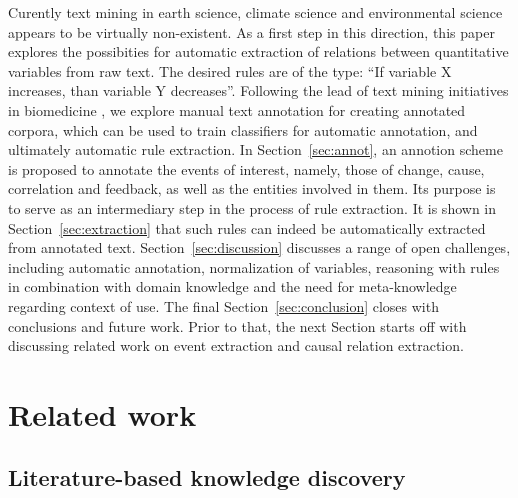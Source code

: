 \documentclass[10pt, a4paper]{article}
\begin{document}
Curently text mining in earth science, climate science and environmental science appears to be virtually non-existent. 
As a first step in this direction, this paper explores the possibities for automatic extraction of relations between quantitative variables from raw text.
The desired rules are of the type: ``If variable X increases, than variable Y decreases''.
Following the lead of text mining initiatives in biomedicine \cite{Kim2009Overview}, we explore manual text annotation for creating annotated corpora, which can be used to train classifiers for automatic annotation, and ultimately automatic rule extraction. 
In Section~\ref{sec:annot}, an annotion scheme is proposed to annotate the events of interest, namely, those of change, cause, correlation and feedback, as well as the entities involved in them.
Its purpose is to serve as an intermediary step in the process of rule extraction.
It is shown in Section~\ref{sec:extraction} that such rules can indeed be automatically extracted from annotated text.
Section~\ref{sec:discussion} discusses a range of open challenges, including automatic annotation, normalization of variables, reasoning with rules in combination with domain knowledge and the need for meta-knowledge regarding context of use.
The final Section~\ref{sec:conclusion} closes with conclusions and future work.
Prior to that, the next Section starts off with discussing related work on event extraction and causal relation extraction.


\section{Related work}
\label{sec:related}


\subsection{Literature-based knowledge discovery}
\end{document}
